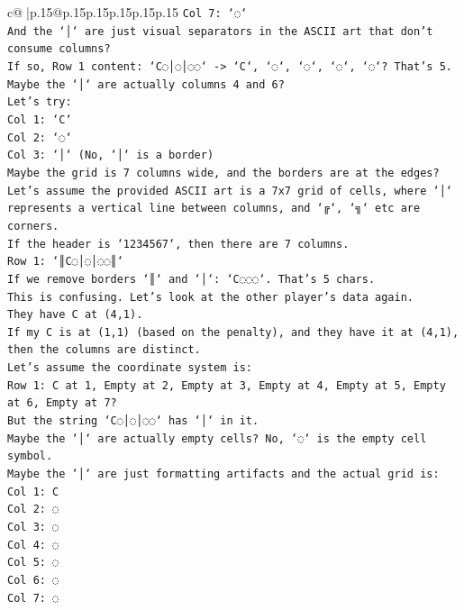 \documentclass{article}
\begin{document}
{\begin{supertabular}{c@{$\;$}|p{.15\linewidth}@{}p{.15\linewidth}p{.15\linewidth}p{.15\linewidth}p{.15\linewidth}p{.15\linewidth}}
{{{\texttt{Col 7: `◌`} \\
\texttt{And the `│` are just visual separators in the ASCII art that don't consume columns?} \\
\texttt{If so, Row 1 content: `C◌│◌│◌◌` {-}> `C`, `◌`, `◌`, `◌`, `◌`? That's 5.} \\
\texttt{Maybe the `│` are actually columns 4 and 6?} \\
\texttt{Let's try:} \\
\texttt{Col 1: `C`} \\
\texttt{Col 2: `◌`} \\
\texttt{Col 3: `│` (No, `│` is a border)} \\
\texttt{Maybe the grid is 7 columns wide, and the borders are at the edges?} \\
\texttt{Let's assume the provided ASCII art is a 7x7 grid of cells, where `│` represents a vertical line between columns, and `╔`, `╗` etc are corners.} \\
\texttt{If the header is `1234567`, then there are 7 columns.} \\
\texttt{Row 1: `║C◌│◌│◌◌║`} \\
\texttt{If we remove borders `║` and `│`: `C◌◌◌`. That's 5 chars.} \\
\texttt{This is confusing. Let's look at the other player's data again.} \\
\texttt{They have C at (4,1).} \\
\texttt{If my C is at (1,1) (based on the penalty), and they have it at (4,1), then the columns are distinct.} \\
\texttt{Let's assume the coordinate system is:} \\
\texttt{Row 1: C at 1, Empty at 2, Empty at 3, Empty at 4, Empty at 5, Empty at 6, Empty at 7?} \\
\texttt{But the string `C◌│◌│◌◌` has `│` in it.} \\
\texttt{Maybe the `│` are actually empty cells? No, `◌` is the empty cell symbol.} \\
\texttt{Maybe the `│` are just formatting artifacts and the actual grid is:} \\
\texttt{Col 1: C} \\
\texttt{Col 2: ◌} \\
\texttt{Col 3: ◌} \\
\texttt{Col 4: ◌} \\
\texttt{Col 5: ◌} \\
\texttt{Col 6: ◌} \\
\texttt{Col 7: ◌} \\
}}}
\end{supertabular}}
\end{document}
